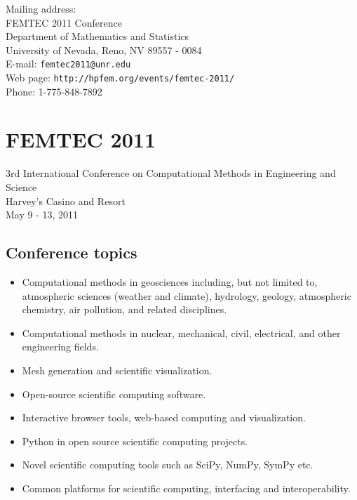 \documentclass[article,A4,11pt]{llncs}
\begin{document}
Mailing address:\\
FEMTEC 2011 Conference\\
Department of Mathematics and Statistics\\
University of Nevada, Reno, NV 89557 - 0084\\ 

\noindent
E-mail: {\tt femtec2011@unr.edu}\\
Web page: {\tt http://hpfem.org/events/femtec-2011/}\\
Phone: 1-775-848-7892

\chapter*{\huge FEMTEC 2011}
\vspace{-5mm}
\normalsize   
\begin{center}
3rd International Conference on Computational Methods in Engineering and Science\\
Harvey's Casino and Resort\\ 
May 9 - 13, 2011\\
\end{center}
\vspace{-3mm}

\section*{Conference topics}

\begin{itemize}
  \item Computational methods in geosciences including, but not limited to, 
        atmospheric sciences (weather and climate), hydrology, geology, 
        atmospheric chemistry, air pollution, and related disciplines. 
  \item Computational methods in nuclear, mechanical, civil, electrical, and 
        other engineering fields. 
  \item Mesh generation and scientific visualization. 
  \item Open-source scientific computing software.
  \item Interactive browser tools, web-based computing and visualization.
  \item Python in open source scientific computing projects.
  \item Novel scientific computing tools such as SciPy, NumPy, SymPy etc.
  \item Common platforms for scientific computing, interfacing and interoperability.
\end{itemize}
\end{document}
